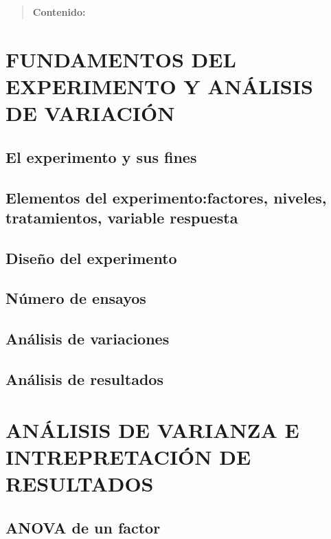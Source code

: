 \documentclass[
  oneside]{book}
\begin{document}
\begin{quote}
\textbf{Contenido:}
\end{quote}

\section{FUNDAMENTOS DEL EXPERIMENTO Y ANÁLISIS DE VARIACIÓN}\label{fundamentos-del-experimento-y-anuxe1lisis-de-variaciuxf3n}

\subsection{El experimento y sus fines}\label{el-experimento-y-sus-fines}

\subsection{Elementos del experimento:factores, niveles, tratamientos, variable respuesta}\label{elementos-del-experimentofactores-niveles-tratamientos-variable-respuesta}

\subsection{Diseño del experimento}\label{diseuxf1o-del-experimento}

\subsection{Número de ensayos}\label{nuxfamero-de-ensayos}

\subsection{Análisis de variaciones}\label{anuxe1lisis-de-variaciones}

\subsection{Análisis de resultados}\label{anuxe1lisis-de-resultados}

\section{ANÁLISIS DE VARIANZA E INTREPRETACIÓN DE RESULTADOS}\label{anuxe1lisis-de-varianza-e-intrepretaciuxf3n-de-resultados}

\subsection{ANOVA de un factor}\label{anova-de-un-factor}
\end{document}
